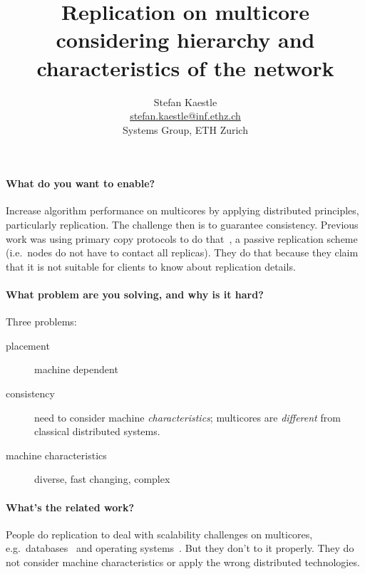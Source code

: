 \documentclass{article}
\begin{document}
\title{Replication on multicore considering hierarchy and
  characteristics of the network}

\newcommand{\eaddr}{stefan.kaestle@inf.ethz.ch}
\newcommand{\email}{\href{mailto:\eaddr}{\eaddr}}

\author{Stefan Kaestle\\
  \email \\
  Systems Group, ETH Zurich}

\maketitle

\paragraph{What do you want to enable?} Increase algorithm performance
on multicores by applying distributed principles, particularly
replication. The challenge then is to guarantee consistency. Previous
work was using primary copy protocols to do that~\cite{Wiesmann2000}, a
passive replication scheme (i.e.\ nodes do not have to contact all
replicas). They do that because they claim that it is not suitable for
clients to know about replication details. 

\paragraph{What problem are you solving, and why is it hard?} Three problems:
\begin{description}
\item[placement] machine dependent
\item[consistency] need to consider machine \emph{characteristics};
  multicores are \emph{different} from classical distributed systems.
\item[machine characteristics] diverse, fast changing, complex
\end{description}

\paragraph{What's the related work?} People do replication to deal
with scalability challenges on multicores, e.g.\
databases~\cite{Salomie2011, Wiesmann2000} and operating
systems~\cite{fos:osr09, tornado:osdi99, barrelfish:sosp09}. But they
don't to it properly. They do not consider machine characteristics or
apply the wrong distributed technologies.
\end{document}
